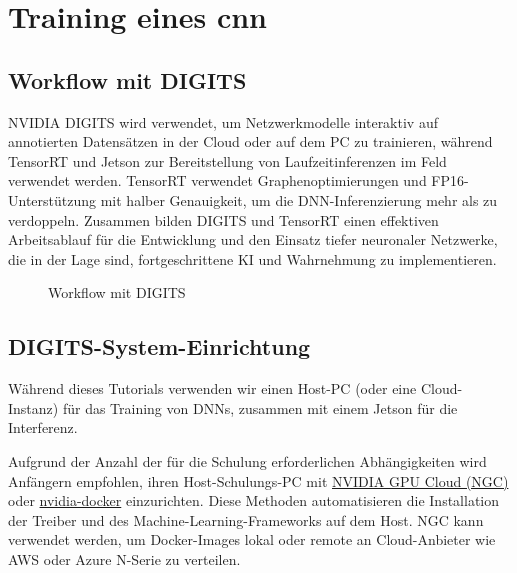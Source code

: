 %
%
%


\chapter{Training eines \ac{cnn}}

\section{Workflow mit DIGITS}

NVIDIA DIGITS wird verwendet, um Netzwerkmodelle interaktiv auf annotierten Datensätzen in der Cloud oder auf dem PC zu trainieren, während TensorRT und Jetson zur Bereitstellung von Laufzeitinferenzen im Feld verwendet werden. TensorRT verwendet Graphenoptimierungen und FP16-Unterstützung mit halber Genauigkeit, um die DNN-Inferenzierung mehr als zu verdoppeln. Zusammen bilden DIGITS und TensorRT einen effektiven Arbeitsablauf für die Entwicklung und den Einsatz tiefer neuronaler Netzwerke, die in der Lage sind, fortgeschrittene KI und Wahrnehmung zu implementieren.

\begin{figure}

  \caption{Workflow mit DIGITS}
\end{figure}


\section{DIGITS-System-Einrichtung}

Während dieses Tutorials verwenden wir einen Host-PC (oder eine Cloud-Instanz) für das Training von DNNs, zusammen mit einem Jetson für die Interferenz.

Aufgrund der Anzahl der für die Schulung erforderlichen Abhängigkeiten wird Anfängern empfohlen, ihren Host-Schulungs-PC mit \href{https://www.nvidia.com/en-us/gpu-cloud/}{NVIDIA GPU Cloud (NGC)} oder \href{https://github.com/NVIDIA/nvidia-docker}{nvidia-docker} einzurichten. Diese Methoden automatisieren die Installation der Treiber und des Machine-Learning-Frameworks auf dem Host. NGC kann verwendet werden, um Docker-Images lokal oder remote an Cloud-Anbieter wie AWS oder Azure N-Serie zu verteilen.

